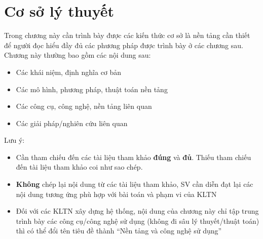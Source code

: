 \chapter{Cơ sở lý thuyết}

Trong chương này cần trình bày được các kiến thức cơ sở là nền tảng cần thiết để người đọc hiểu đầy đủ các phương pháp được trình bày ở các chương sau. Chương này thường bao gồm các nội dung sau:
\begin{itemize}
    \item Các khái niệm, định nghĩa cơ bản
    \item Các mô hình, phương pháp, thuật toán nền tảng
    \item Các công cụ, công nghệ, nền tảng liên quan
    \item Các giải pháp/nghiên cứu liên quan
    
\end{itemize}

Lưu ý:

\begin{itemize}
    \item Cần tham chiếu đến các tài liệu tham khảo \textbf{đúng} và \textbf{đủ}. Thiếu tham chiếu đến tài liệu tham khảo coi như sao chép.
    \item \textbf{Không} chép lại nội dung từ các tài liệu tham khảo, SV cần diễn đạt lại các nội dung tương ứng phù hợp với bài toán và phạm vi của KLTN
    \item Đối với các KLTN xây dựng hệ thống, nội dung của chương này chỉ tập trung trình bày các công cụ/công nghệ sử dụng (không đi sâu lý thuyết/thuật toán) thì có thể đổi tên tiêu đề thành ``Nền tảng và công nghệ sử dụng''
\end{itemize}